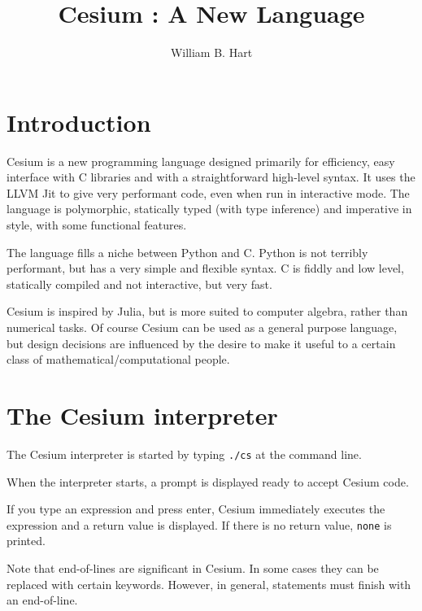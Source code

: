 \documentclass[a4paper,10pt]{article}
\title{Cesium : A New Language}
\author{William B. Hart}
\newcommand{\code}{\lstinline}
\begin{document}
\maketitle
\tableofcontents

\section{Introduction}

Cesium is a new programming language designed primarily for efficiency, easy interface with C libraries
and with a straightforward high-level syntax. It uses the LLVM Jit to give very performant code, even
when run in interactive mode. The language is polymorphic, statically typed (with type inference) and
imperative in style, with some functional features.

The language fills a niche between Python and C. Python is not terribly performant, but has a very
simple and flexible syntax. C is fiddly and low level, statically compiled and not interactive, but very 
fast. 

Cesium is inspired by Julia, but is more suited to computer algebra, rather than numerical tasks.
Of course Cesium can be used as a general purpose language, but design decisions are influenced by the
desire to make it useful to a certain class of mathematical/computational people.

\section{The Cesium interpreter}

The Cesium interpreter is started by typing \code{./cs} at the command line.

When the interpreter starts, a prompt is displayed ready to accept Cesium code.

If you type an expression and press enter, Cesium immediately executes the expression and a return 
value is displayed. If there is no return value, \code{none} is printed.

Note that end-of-lines are significant in Cesium. In some cases they can be replaced with
certain keywords. However, in general, statements must finish with an end-of-line.
\end{document}
